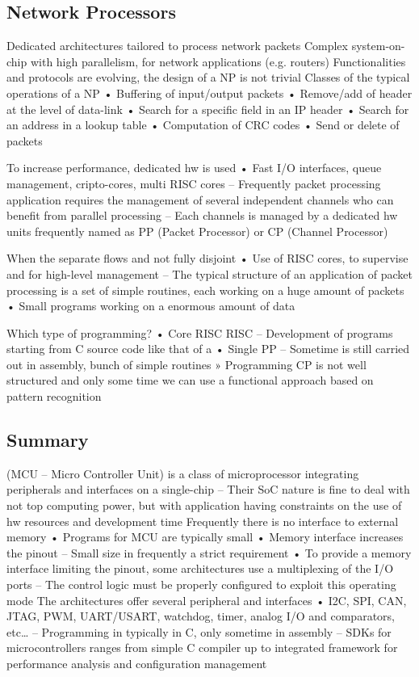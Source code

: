 \subsection{Network Processors}
Dedicated architectures tailored to process network packets
Complex system-on-chip with high parallelism, for network applications (e.g. routers)
Functionalities and protocols are evolving, the design of a NP is not trivial
Classes of the typical operations of a NP
• Buffering of input/output packets
• Remove/add of header at the level of data-link
• Search for a specific field in an IP header
• Search for an address in a lookup table
• Computation of CRC codes
• Send or delete of packets

To increase performance, dedicated hw is used
• Fast I/O interfaces, queue management, cripto-cores, multi RISC
cores
– Frequently packet processing application requires the
management of several independent channels who can benefit
from parallel processing
– Each channels is managed by a dedicated hw units frequently
named as PP (Packet Processor) or CP (Channel Processor)

When the separate flows and not fully disjoint
• Use of RISC cores, to supervise and for high-level management
– The typical structure of an application of packet processing is a
set of simple routines, each working on a huge amount of
packets
• Small programs working on a enormous amount of data

Which type of programming?
• Core RISC
RISC
– Development of programs starting from C source code like that of a
• Single PP
– Sometime is still carried out in assembly, bunch of simple routines
» Programming CP is not well structured and only some time we can use a
functional approach based on pattern recognition

\subsection{Summary}
(MCU – Micro Controller Unit) is a class of microprocessor
integrating peripherals and interfaces on a single-chip
– Their SoC nature is fine to deal with not top computing power,
but with application having constraints on the use of hw
resources and development time
Frequently there is no interface to external memory
• Programs for MCU are typically small
• Memory interface increases the pinout
– Small size in frequently a strict requirement
• To provide a memory interface limiting the pinout, some
architectures use a multiplexing of the I/O ports
– The control logic must be properly configured to exploit this operating
mode
The architectures offer several peripheral and interfaces
• I2C, SPI, CAN, JTAG, PWM, UART/USART, watchdog, timer,
analog I/O and comparators, etc…
– Programming in typically in C, only sometime in assembly
– SDKs for microcontrollers ranges from simple C compiler up to
integrated framework for performance analysis and configuration
management
